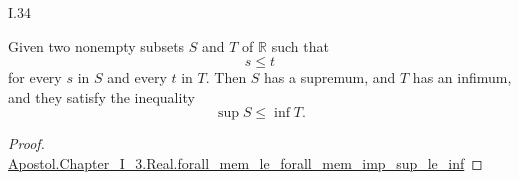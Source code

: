 \documentclass{article}
\begin{document}
\begin{xtheorem}{I.34}

  Given two nonempty subsets $S$ and $T$ of $\mathbb{R}$ such that
  $$s \leq t$$
  for every $s$ in $S$ and every $t$ in $T$. Then $S$ has a supremum, and $T$
  has an infimum, and they satisfy the inequality
  $$\sup{S} \leq \inf{T}.$$

\end{xtheorem}

\begin{proof}

  \href{Chapter_I_3.lean}{Apostol.Chapter_I_3.Real.forall_mem_le_forall_mem_imp_sup_le_inf}

\end{proof}
\end{document}
